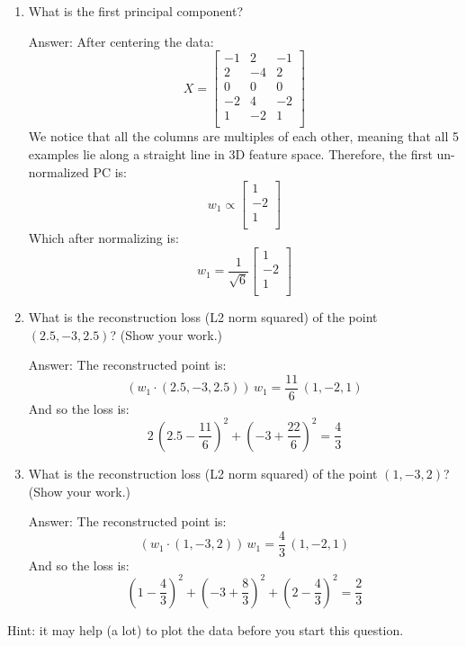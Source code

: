 \documentclass{article}
\newcommand{\blu}[1]{{\textcolor{blu}{#1}}}
\newenvironment{answer}{\par\begingroup\color{gre}Answer: }{\endgroup}
\let\ask\blu
\begin{document}
\begin{enumerate}
  \item \ask{What is the first principal component?}
  \begin{answer}
      After centering the data:
        \[
            X =
            \begin{bmatrix}
                -1 &  2 & -1 \\
                 2 & -4 &  2 \\
                 0 &  0 &  0 \\
                -2 &  4 & -2 \\
                 1 & -2 &  1 \\
            \end{bmatrix}
        \]
      We notice that all the columns are multiples of each other, meaning that all 5 examples lie along a straight line in 3D feature space. Therefore, the first un-normalized PC is:
      \[
          w_1 \propto
          \begin{bmatrix}
              1 \\
              -2 \\
              1 \\
          \end{bmatrix}
      \]
      Which after normalizing is:
      \[
          w_1 = \frac{1}{\sqrt{6}}
          \begin{bmatrix}
              1 \\
              -2 \\
              1 \\
          \end{bmatrix}
      \]
  \end{answer}

  \item \ask{What is the reconstruction loss (L2 norm squared) of the point $(2.5, -3, 2.5)$? (Show your work.)}
  \begin{answer}
      The reconstructed point is:
      \[
          (w_1 \cdot (2.5, -3, 2.5))\, w_1 = \frac{11}{6}\, (1, -2, 1)
      \]
      And so the loss is:
      \[
          2\, \left(2.5 - \frac{11}{6}\right)^2 + \left(-3 + \frac{22}{6}\right)^2 = \frac{4}{3}
      \]
  \end{answer}

  \item \ask{What is the reconstruction loss (L2 norm squared) of the point $(1, -3, 2)$? (Show your work.)}
  \begin{answer}
      The reconstructed point is:
      \[
          (w_1 \cdot (1, -3, 2))\, w_1 = \frac{4}{3}\, (1, -2, 1)
      \]
      And so the loss is:
      \[
          \left(1 - \frac{4}{3}\right)^2 + \left(-3 + \frac{8}{3}\right)^2 + \left(2 - \frac{4}{3}\right)^2 = \frac{2}{3}
      \]
  \end{answer}
\end{enumerate}
Hint: it may help (a lot) to plot the data before you start this question.
\end{document}
